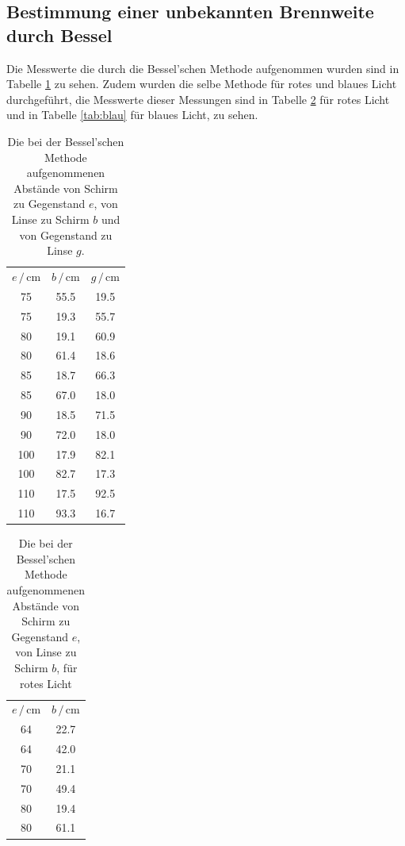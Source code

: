 \subsection{Bestimmung einer unbekannten Brennweite durch Bessel}
Die Messwerte die durch die Bessel'schen Methode aufgenommen wurden sind in Tabelle \ref{tab:bessel_weiß} zu sehen.
Zudem wurden die selbe Methode für rotes und blaues Licht durchgeführt, die Messwerte dieser Messungen sind in Tabelle \ref{tab:rot} für rotes Licht und in Tabelle \ref{tab:blau} für blaues Licht, zu sehen.
\begin{table}
    \centering
    \begin{tabular}{ccc}
    \toprule
    $e\,/\,\si{\centi\meter}$ & $b\,/\, \si{\centi\meter}$ & $ g\,/\, \si{\centi\meter} $ \\
    75 & 55.5 & 19.5    \\
    75 & 19.3 & 55.7    \\
    80 & 19.1 & 60.9    \\
    80 & 61.4 & 18.6    \\
    85 & 18.7 & 66.3    \\
    85 & 67.0 & 18.0    \\
    90 & 18.5 & 71.5    \\
    90 & 72.0 & 18.0    \\
    100 & 17.9 & 82.1   \\
    100 & 82.7 & 17.3   \\
    110 & 17.5 & 92.5   \\
    110 & 93.3 & 16.7   \\
    \bottomrule
    \end{tabular}
    \caption{Die bei der Bessel'schen Methode aufgenommenen Abstände von Schirm zu Gegenstand $e$, von Linse zu Schirm $b$ und von Gegenstand zu Linse $g$.}
    \label{tab:bessel_weiß}
\end{table}

\begin{table}
    \centering
    \begin{tabular}{cc}
    \toprule
    $e\,/\,\si{\centi\meter}$ & $b\,/\, \si{\centi\meter}$\\
    64 & 22.7 \\
    64 & 42.0 \\
    70 & 21.1 \\
    70 & 49.4 \\
    80 & 19.4 \\
    80 & 61.1 \\
    \bottomrule
    \end{tabular}
    \caption{Die bei der Bessel'schen Methode aufgenommenen Abstände von Schirm zu Gegenstand $e$, von Linse zu Schirm $b$, für rotes Licht}
    \label{tab:rot}
\end{table}

